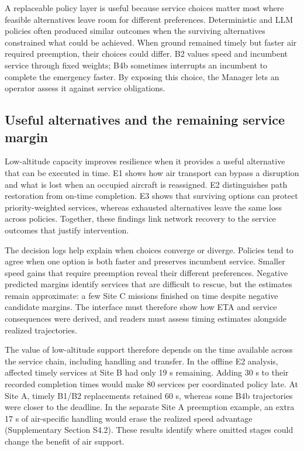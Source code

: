 \documentclass[]{interact}
\theoremstyle{plain}
\theoremstyle{definition}
\theoremstyle{remark}
\begin{document}
A replaceable policy layer is useful because service choices matter most where feasible alternatives leave room for different preferences. Deterministic and LLM policies often produced similar outcomes when the surviving alternatives constrained what could be achieved. When ground remained timely but faster air required preemption, their choices could differ. B2 values speed and incumbent service through fixed weights; B4b sometimes interrupts an incumbent to complete the emergency faster. By exposing this choice, the Manager lets an operator assess it against service obligations.

\subsection{Useful alternatives and the remaining service margin}

Low-altitude capacity improves resilience when it provides a useful alternative that can be executed in time. E1 shows how air transport can bypass a disruption and what is lost when an occupied aircraft is reassigned. E2 distinguishes path restoration from on-time completion. E3 shows that surviving options can protect priority-weighted services, whereas exhausted alternatives leave the same loss across policies. Together, these findings link network recovery to the service outcomes that justify intervention. \citep{ref1,ref3}

The decision logs help explain when choices converge or diverge. Policies tend to agree when one option is both faster and preserves incumbent service. Smaller speed gains that require preemption reveal their different preferences. Negative predicted margins identify services that are difficult to rescue, but the estimates remain approximate: a few Site C missions finished on time despite negative candidate margins. The interface must therefore show how ETA and service consequences were derived, and readers must assess timing estimates alongside realized trajectories.

The value of low-altitude support therefore depends on the time available across the service chain, including handling and transfer. In the offline E2 analysis, affected timely services at Site B had only 19 s remaining. Adding 30 s to their recorded completion times would make 80 services per coordinated policy late. At Site A, timely B1/B2 replacements retained 60 s, whereas some B4b trajectories were closer to the deadline. In the separate Site A preemption example, an extra 17 s of air-specific handling would erase the realized speed advantage (Supplementary Section S4.2). These results identify where omitted stages could change the benefit of air support.
\end{document}
